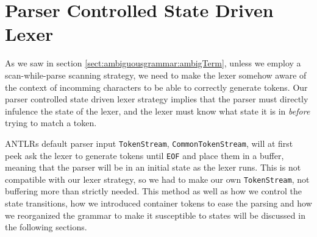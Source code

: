\section{Parser Controlled State Driven Lexer}
\label{sect:impl:parser_controlled_state_driven_lexer}
As we saw in section \ref{sect:ambiguousgrammar:ambigTerm}, unless we employ a scan-while-parse scanning strategy, we need to make the lexer somehow aware of the context of incomming characters to be able to correctly generate tokens. Our parser controlled state driven lexer strategy implies that the parser must directly infulence the state of the lexer, and the lexer must know what state it is in \emph{before} trying to match a token. 

ANTLRs default parser input \verb!TokenStream!, \verb!CommonTokenStream!, will at first peek ask the lexer to generate tokens until \verb!EOF! and place them in a buffer, meaning that the parser will be in an initial state as the lexer runs. This is not compatible with our lexer strategy, so we had to make our own \verb!TokenStream!, not buffering more than strictly needed. This method as well as how we control the state transitions, how we introduced container tokens to ease the parsing and how we reorganized the grammar to make it susceptible to states will be discussed in the following sections.

